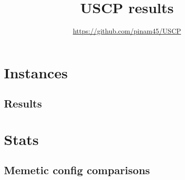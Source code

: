 \documentclass[12pt,a4paper,twoside]{article}
\title{USCP results}
\author{\url{https://github.com/pinam45/USCP}}
\date{\DTMusedate{generated} \DTMusetime{generated}}
\begin{document}
	\maketitle{}
	\tableofcontents{}
	\listoftables{}
	\newpage\section{Instances}
		
		
		
		
	\begin{landscape}
		\newpage\section{Results}
			
	\end{landscape}
	\newpage\section{Stats}
		
	\begin{landscape}
		\newpage\section{Memetic config comparisons}
			
			\newpage
			\newpage
			\newpage
			\newpage
			\newpage
			\newpage
			\newpage
			\newpage
			\newpage
			\newpage
			\newpage
			\newpage
			\newpage
			\newpage
			\newpage
			\newpage
			\newpage
			\newpage
	\end{landscape}
\end{document}
